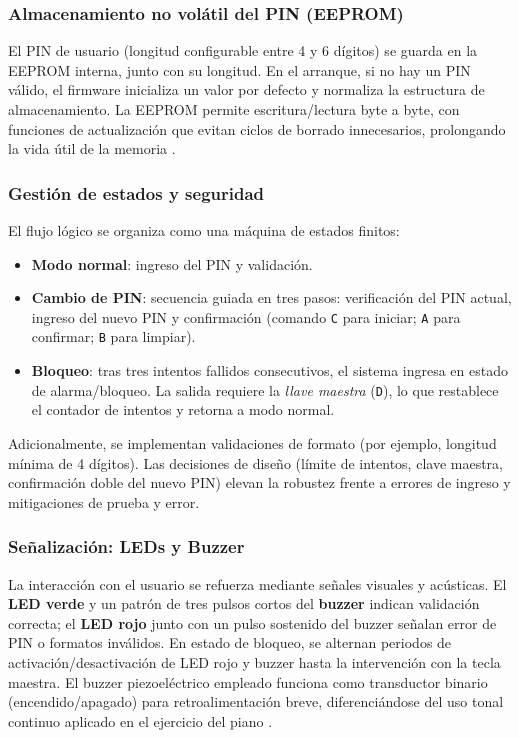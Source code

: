 \subsubsection{Almacenamiento no volátil del PIN (EEPROM)}
El PIN de usuario (longitud configurable entre 4 y 6 dígitos) se guarda en la EEPROM interna, junto con su longitud. En el arranque, si no hay un PIN válido, el firmware inicializa un valor por defecto y normaliza la estructura de almacenamiento. La EEPROM permite escritura/lectura byte a byte, con funciones de actualización que evitan ciclos de borrado innecesarios, prolongando la vida útil de la memoria \cite{atmega328p_datasheet}.

\subsubsection{Gestión de estados y seguridad}
El flujo lógico se organiza como una máquina de estados finitos:
\begin{itemize}
    \item \textbf{Modo normal}: ingreso del PIN y validación.
    \item \textbf{Cambio de PIN}: secuencia guiada en tres pasos: verificación del PIN actual, ingreso del nuevo PIN y confirmación (comando \texttt{C} para iniciar; \texttt{A} para confirmar; \texttt{B} para limpiar).
    \item \textbf{Bloqueo}: tras tres intentos fallidos consecutivos, el sistema ingresa en estado de alarma/bloqueo. La salida requiere la \textit{llave maestra} (\texttt{D}), lo que restablece el contador de intentos y retorna a modo normal.
\end{itemize}
Adicionalmente, se implementan validaciones de formato (por ejemplo, longitud mínima de 4 dígitos). Las decisiones de diseño (límite de intentos, clave maestra, confirmación doble del nuevo PIN) elevan la robustez frente a errores de ingreso y mitigaciones de prueba y error.

\subsubsection{Señalización: LEDs y Buzzer}
La interacción con el usuario se refuerza mediante señales visuales y acústicas. El \textbf{LED verde} y un patrón de tres pulsos cortos del \textbf{buzzer} indican validación correcta; el \textbf{LED rojo} junto con un pulso sostenido del buzzer señalan error de PIN o formatos inválidos. En estado de bloqueo, se alternan periodos de activación/desactivación de LED rojo y buzzer hasta la intervención con la tecla maestra. El buzzer piezoeléctrico empleado funciona como transductor binario (encendido/apagado) para retroalimentación breve, diferenciándose del uso tonal continuo aplicado en el ejercicio del piano \cite{buzzer_emx7t05sp_datasheet}.

